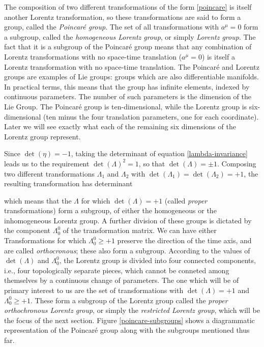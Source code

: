 \documentclass[12pt,a4paper,notitlepage]{report}
\begin{document}
The composition of two different transformations of the form \eqref{poincare} is itself another Lorentz transformation, so these transformations are said to form a group, called the {\it Poincaré group}. The set of all transformations with $a^\mu = 0$ form a subgroup, called the {\it homogeneous Lorentz group}, or simply {\it Lorentz group}. The fact that it is a subgroup of the Poincaré group means that any combination of Lorentz transformations with no space-time translation ($a^\mu = 0$) is itself a Lorentz transformation with no space-time translation. The Poincaré and Lorentz groups are examples of Lie groups: groups which are also differentiable manifolds. In practical terms, this means that the group has infinite elements, indexed by continuous parameters. The number of such parameters is the dimension of the Lie Group. The Poincaré group is ten-dimensional, while the Lorentz group is six-dimensional (ten minus the four translation parameters, one for each coordinate). Later we will see exactly what each of the remaining six dimensions of the Lorentz group represent.

Since $\det(\eta) = -1$, taking the determinant of equation \eqref{lambda-invariance} leads us to the requirement $\det(\Lambda)^2 = 1$, so that $\det(\Lambda) = \pm 1$. Composing two different transformations $\Lambda_1$ and $\Lambda_2$ with $\det(\Lambda_1) = \det(\Lambda_2) = +1$, the resulting transformation has determinant

which means that the $\Lambda$ for which $\det(\Lambda) = +1$ (called {\it proper} transformations) form a subgroup, of either the homogeneous or the inhomogeneous Lorentz group. A further division of these groups is dictated by the component $\Lambda^0_0$ of the transformation matrix. We can have either
%
%
Transformations for which $\Lambda^0_0 \geqslant +1$ preserve the direction of the time axis, and are called {\it orthocronous}; these also form a subgroup. According to the values of $\det(\Lambda)$ and $\Lambda^0_0$, the Lorentz group is divided into four connected components, i.e., four topologically separate pieces, which cannot be conneted among themselves by a continuous change of parameters. The one which will be of primary interest to us are the set of transformations with $\det(\Lambda) = +1$ and $\Lambda^0_0 \geqslant +1$. These form a subgroup of the Lorentz group called the {\it proper orthochronous Lorentz group}, or simply the {\it restricted Lorentz group}, which will be the focus of the next section. Figure \ref{poincare-subgroups} shows a diagrammatic representation of the Poincaré group along with the subgroups mentioned thus far.
\end{document}
